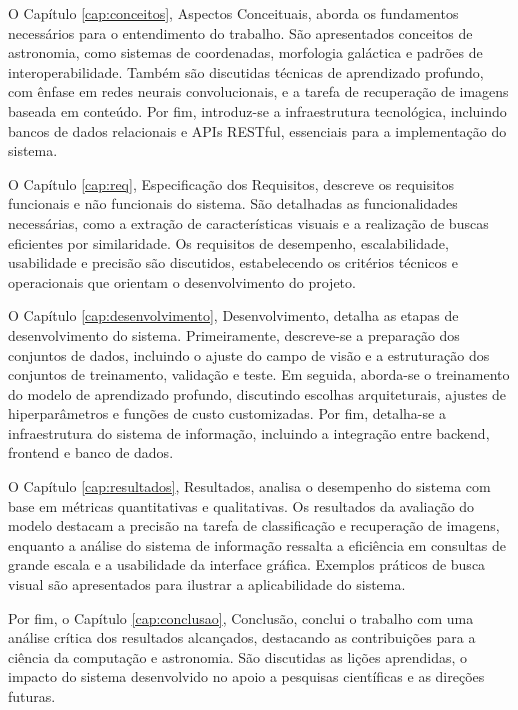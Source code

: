 O Capítulo \ref{cap:conceitos}, Aspectos Conceituais, aborda os fundamentos necessários para o entendimento do trabalho. São apresentados conceitos de astronomia, como sistemas de coordenadas, morfologia galáctica e padrões de interoperabilidade. Também são discutidas técnicas de aprendizado profundo, com ênfase em redes neurais convolucionais, e a tarefa de recuperação de imagens baseada em conteúdo. Por fim, introduz-se a infraestrutura tecnológica, incluindo bancos de dados relacionais e APIs RESTful, essenciais para a implementação do sistema.

O Capítulo \ref{cap:req}, Especificação dos Requisitos, descreve os requisitos funcionais e não funcionais do sistema. São detalhadas as funcionalidades necessárias, como a extração de características visuais e a realização de buscas eficientes por similaridade. Os requisitos de desempenho, escalabilidade, usabilidade e precisão são discutidos, estabelecendo os critérios técnicos e operacionais que orientam o desenvolvimento do projeto.

O Capítulo \ref{cap:desenvolvimento}, Desenvolvimento, detalha as etapas de desenvolvimento do sistema. Primeiramente, descreve-se a preparação dos conjuntos de dados, incluindo o ajuste do campo de visão e a estruturação dos conjuntos de treinamento, validação e teste. Em seguida, aborda-se o treinamento do modelo de aprendizado profundo, discutindo escolhas arquiteturais, ajustes de hiperparâmetros e funções de custo customizadas. Por fim, detalha-se a infraestrutura do sistema de informação, incluindo a integração entre backend, frontend e banco de dados.

O Capítulo \ref{cap:resultados}, Resultados, analisa o desempenho do sistema com base em métricas quantitativas e qualitativas. Os resultados da avaliação do modelo destacam a precisão na tarefa de classificação e recuperação de imagens, enquanto a análise do sistema de informação ressalta a eficiência em consultas de grande escala e a usabilidade da interface gráfica. Exemplos práticos de busca visual são apresentados para ilustrar a aplicabilidade do sistema.

Por fim, o Capítulo \ref{cap:conclusao}, Conclusão, conclui o trabalho com uma análise crítica dos resultados alcançados, destacando as contribuições para a ciência da computação e astronomia. São discutidas as lições aprendidas, o impacto do sistema desenvolvido no apoio a pesquisas científicas e as direções futuras.

